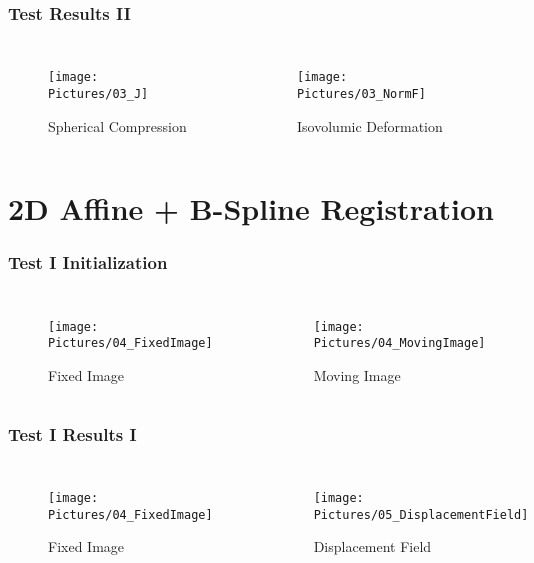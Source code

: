 \documentclass[xcolor=table]{beamer}
\begin{document}
\begin{frame}
	\frametitle{Test Results II}
	\begin{columns}
		\centering
		\begin{figure}
			\texttt{[image: Pictures/03\_J]}
			\caption{Spherical Compression}
		\end{figure}
		\centering
		\begin{figure}
			\texttt{[image: Pictures/03\_NormF]}
			\caption{Isovolumic Deformation}
		\end{figure}
	\end{columns}
\end{frame}


\section{2D Affine + B-Spline Registration}

\begin{frame}
	\frametitle{Test I Initialization}
	\begin{columns}
		\column[c]{0.45\linewidth}
		\centering
		\begin{figure}
			\texttt{[image: Pictures/04\_FixedImage]}
			\caption{Fixed Image}
		\end{figure}
		\column[c]{0.45\linewidth}
		\centering
		\begin{figure}
			\texttt{[image: Pictures/04\_MovingImage]}
			\caption{Moving Image}
		\end{figure}
	\end{columns}
\end{frame}



\begin{frame}
	\frametitle{Test I Results I}
	\begin{columns}
		\centering
		\begin{figure}
			\texttt{[image: Pictures/04\_FixedImage]}
			\caption{Fixed Image}
		\end{figure}
		\centering
		\begin{figure}
			\texttt{[image: Pictures/05\_DisplacementField]}
			\caption{Displacement Field}
		\end{figure}
	\end{columns}
\end{frame}
\end{document}
